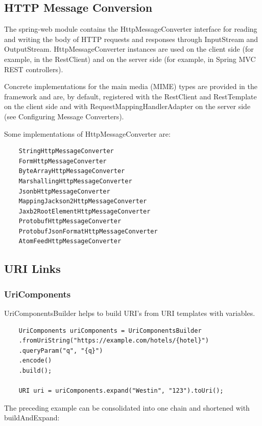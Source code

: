\documentclass{scrartcl}
\begin{document}
\subsection{HTTP Message Conversion}

The spring-web module contains the HttpMessageConverter interface for reading and writing the body of HTTP requests and responses through InputStream and OutputStream. HttpMessageConverter instances are used on the client side (for example, in the RestClient) and on the server side (for example, in Spring MVC REST controllers).

Concrete implementations for the main media (MIME) types are provided in the framework and are, by default, registered with the RestClient and RestTemplate on the client side and with RequestMappingHandlerAdapter on the server side (see Configuring Message Converters).

Some implementations of HttpMessageConverter are:

    \begin{lstlisting}
    StringHttpMessageConverter
    FormHttpMessageConverter
    ByteArrayHttpMessageConverter
    MarshallingHttpMessageConverter
    JsonbHttpMessageConverter
    MappingJackson2HttpMessageConverter
    Jaxb2RootElementHttpMessageConverter
    ProtobufHttpMessageConverter
    ProtobufJsonFormatHttpMessageConverter
    AtomFeedHttpMessageConverter
    \end{lstlisting}

\subsection{URI Links}

\subsubsection{UriComponents}

UriComponentsBuilder helps to build URI’s from URI templates with variables.

\begin{lstlisting}
    UriComponents uriComponents = UriComponentsBuilder
    .fromUriString("https://example.com/hotels/{hotel}")
    .queryParam("q", "{q}")
    .encode()
    .build();

    URI uri = uriComponents.expand("Westin", "123").toUri();
\end{lstlisting}

The preceding example can be consolidated into one chain and shortened with buildAndExpand:
\end{document}
